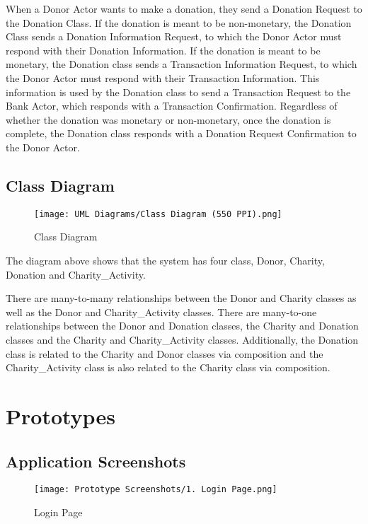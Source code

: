 \documentclass{scrreprt}
\begin{document}
    When a Donor Actor wants to make a donation, they send a Donation Request to the Donation Class. If the donation is meant to be non-monetary, the Donation Class sends a Donation Information Request, to which the Donor Actor must respond with their Donation Information. If the donation is meant to be monetary, the Donation class sends a Transaction Information Request, to which the Donor Actor must respond with their Transaction Information. This information is used by the Donation class to send a Transaction Request to the Bank Actor, which responds with a Transaction Confirmation. Regardless of whether the donation was monetary or non-monetary, once the donation is complete, the Donation class responds with a Donation Request Confirmation to the Donor Actor.
    
    \section{Class Diagram}
        \begin{figure}[H]
            \centering
            \texttt{[image: UML Diagrams/Class Diagram (550 PPI).png]}
            {\caption*{Class Diagram}}
        \end{figure}
    
    The diagram above shows that the system has four class, Donor, Charity, Donation and Charity\_Activity.\par
    
    There are many-to-many relationships between the Donor and Charity classes as well as the Donor and Charity\_Activity classes. There are many-to-one relationships between the Donor and Donation classes, the Charity and Donation classes and the Charity and Charity\_Activity classes. Additionally, the Donation class is related to the Charity and Donor classes via composition and the Charity\_Activity class is also related to the Charity class via composition.
    

\chapter{Prototypes}

    \section{Application Screenshots}
        
        \begin{figure}[!h]
            \centering
            \texttt{[image: Prototype Screenshots/1. Login Page.png]}
            {\caption*{Login Page}}
        \end{figure}
        
\end{document}

